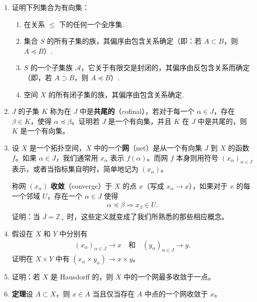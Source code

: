 \begin{enumerate}
\item 证明下列集合为有向集：
\begin{enumerate}
\item 在关系 $\leqslant$ 下的任何一个全序集.
\item 集合 $S$ 的所有子集的族，其偏序由包含关系确定（即：若 $A\subset B$，则 $A\preceq B$）.
\item $S$ 的一个子集族 $\mathcal{A}$，它关于有限交是封闭的，其偏序由反包含关系而确定（即，若 $A\supset B$，则 $A\preceq B$）.
\item 空间 $X$ 的所有闭子集的族，其偏序由包含关系确定.
\end{enumerate}
\item $J$ 的子集 $K$ 称为在 $J$ 中是\textbf{共尾的}（cofinal），若对于每一个 $\alpha\in J$，存在 $\beta\in K$，使得 $\alpha\preceq\beta$。证明若 $J$ 是一个有向集，并且 $K$ 在 $J$ 中是共尾的，则 $K$ 是一个有向集。
\item 设 $X$ 是一个拓扑空间，$X$ 中的一个\textbf{网}（net）是从一个有向集 $J$ 到 $X$ 的函数 $f$。如果 $\alpha\in J$，我们通常用 $x_{\alpha}$ 表示 $f(\alpha)$。而网 $f$ 本身则用符号 $(x_{\alpha})_{\alpha\in J}$ 表示，或者当指标集自明时，简单地记为 $(x_{\alpha})$。

称网 $(x_{\alpha})$ \textbf{收敛}（converge）于 $X$ 的点 $x$（写成 $x_{\alpha}\to x$），如果对于 $x$ 的每一个邻域 $U$，存在一个 $\alpha\in J$ 使得
\begin{align*}
\alpha\preceq\beta\Longrightarrow x_{\beta}\in U.
\end{align*}
证明：当 $J=\mathbb{Z}_{+}$ 时，这些定义就变成了我们所熟悉的那些相应概念。
\item 假设在 $X$ 和 $Y$ 中分别有
\begin{align*}
(x_{\alpha})_{\alpha\in J}\longrightarrow x\quad\text{和}\quad(y_{\alpha})_{\alpha\in J}\longrightarrow y.
\end{align*}
证明在 $X\times Y$ 中有 $(x_{\alpha}\times y_{\alpha})\to x\times y$。
\item 证明：若 $X$ 是 Hausdorff 的，则 $X$ 中的一个网最多收敛于一点。
\item \textbf{定理}\quad 设 $A\subset X$，则 $x\in\overline{A}$ 当且仅当存在 $A$ 中点的一个网收敛于 $x$。


\end{enumerate}
